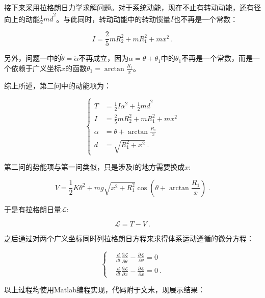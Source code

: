 \documentclass[a4paper,c5size,twoside,UTF8]{ctexart} %
\newcommand{\FS}[2]{\displaystyle\frac{#1}{#2}}
\numberwithin{equation}{section}   %
\begin{document}
接下来采用拉格朗日力学求解问题。对于系统动能，现在不止有转动动能，还有径向上的动能$\frac{1}{2}{m\dot{d}^2}$。与此同时，转动动能中的转动惯量$I$也不再是一个常数：

\begin{equation}
    I=\frac{2}{5}mR_2^2+mR_1^2+mx^2~.
\end{equation}



另外，问题一中的$\dot{\theta}=\dot{\alpha}$不再成立，因为$\alpha=\theta+\theta_1$中的$\theta_1$不再是一个常数，而是一个依赖于广义坐标$x$的函数$\theta_1=\arctan{\FS{R_1}{x}}$。

综上所述，第二问中的动能项为：

\begin{equation}
	\left\{
		\begin{aligned}
			T & =\FS{1}{2}I\dot{\alpha}^2+\FS{1}{2}m\dot{d}^2  \\
			I & =\FS{2}{5}mR_2^2+mR_1^2+mx^2 \\
			\alpha & =\theta +\arctan{\FS{R_1}{x}} \\
			d &= \sqrt{R_1^2+x^2} ~.
		\end{aligned}
	\right.
\end{equation}



第二问的势能项与第一问类似，只是涉及$l$的地方需要换成$x$:

\begin{equation}
	V  =  \FS{1}{2}K\theta^2+mg\sqrt{x^2+R_1^2}\cos{\left(\theta+\arctan{\FS{R_1}{x}}\right)}~.
\end{equation}


于是有拉格朗日量$\mathcal{L}$:


\begin{equation}
    \mathcal{L}=T-V~.
\end{equation}


之后通过对两个广义坐标同时列拉格朗日方程来求得体系运动遵循的微分方程：

\begin{equation}
	\left\{
\begin{aligned}
	&\FS{d}{dt}\FS{\partial \mathcal{L}}{\partial \dot{\theta}}-\FS{\partial{\mathcal{L}}}{\partial{\theta}}=0  \\
	&\FS{d}{dt}\FS{\partial \mathcal{L}}{\partial \dot{x}}-\FS{\partial{\mathcal{L}}}{\partial{x}}=0  ~.
\end{aligned}
    \right.
\end{equation}


\newpage
以上过程均使用Matlab编程实现，代码附于文末，现展示结果：
\end{document}
